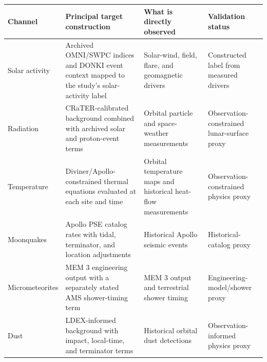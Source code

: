 \begin{center}
\centering
\scriptsize
\begin{tabular}{@{}p{2.1cm}p{4.6cm}p{4.0cm}p{3.4cm}@{}}
\toprule
Channel & Principal target construction & What is directly observed & Validation status \\
\midrule
Solar activity & Archived OMNI/SWPC indices and DONKI event context mapped to the study's solar-activity label & Solar-wind, field, flare, and geomagnetic drivers & Constructed label from measured drivers \\
Radiation & CRaTER-calibrated background combined with archived solar and proton-event terms & Orbital particle and space-weather measurements & Observation-constrained lunar-surface proxy \\
Temperature & Diviner/Apollo-constrained thermal equations evaluated at each site and time & Orbital temperature maps and historical heat-flow measurements & Observation-constrained physics proxy \\
Moonquakes & Apollo PSE catalog rates with tidal, terminator, and location adjustments & Historical Apollo seismic events & Historical-catalog proxy \\
Micrometeorites & MEM 3 engineering output with a separately stated AMS shower-timing term & MEM 3 output and terrestrial shower timing & Engineering-model/shower proxy \\
Dust & LDEX-informed background with impact, local-time, and terminator terms & Historical orbital dust detections & Observation-informed physics proxy \\
\bottomrule
\end{tabular}
\label{tab:provenance}
\end{center}

